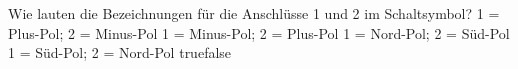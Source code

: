     {Wie lauten die Bezeichnungen für die Anschlüsse 1 und 2 im Schaltsymbol?}
    {1 = Plus-Pol; 2 = Minus-Pol}
    {1 = Minus-Pol; 2 = Plus-Pol}
    {1 = Nord-Pol; 2 = Süd-Pol}
    {1 = Süd-Pol; 2 = Nord-Pol}
    {true}{false}